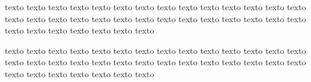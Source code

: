 \documentclass{article}
\begin{document}
texto texto texto texto texto texto texto
texto texto texto texto texto texto texto
texto texto texto texto texto texto texto
texto texto texto texto texto texto texto
texto texto texto texto texto texto texto

texto texto texto texto texto texto texto
texto texto texto texto texto texto texto
texto texto texto texto texto texto texto
texto texto texto texto texto texto texto
texto texto texto texto texto texto texto
\end{document}
